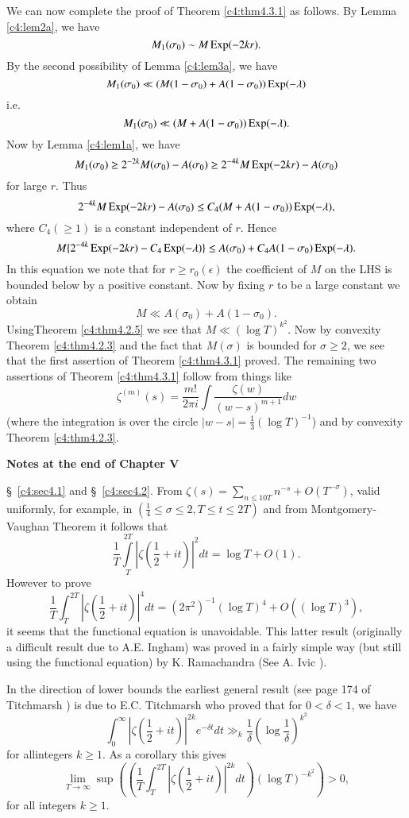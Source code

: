 We can now complete the proof of Theorem \ref{c4:thm4.3.1} as follows. By Lemma \ref{c4:lem2a}, we have
$$
M_1 (\sigma_0) \sim M \operatorname{Exp} (-2 kr).
$$
By the second possibility of Lemma \ref{c4:lem3a}, we have
$$
M_1 (\sigma_0) \ll (M(1-\sigma_0) + A (1-\sigma_0)) \operatorname{Exp} (-\lambda)
$$
i.e.
$$
M_1 (\sigma_0) \ll (M+A(1-\sigma_0)) \operatorname{Exp} (-\lambda).
$$
Now by Lemma \ref{c4:lem1a}, we have 
$$M_1(\sigma_0) \geq 2^{-2k} M(\sigma_0) - A(\sigma_0) \geq 2^{-4k} M
\operatorname{Exp} (-2kr) - A(\sigma_0)$$ 
for large $r$. Thus
$$
2^{-4k} M \operatorname{Exp} (-2kr) - A(\sigma_0) \leq C_4 (M + A(1-\sigma_0)) \operatorname{Exp} (-\lambda),
$$
where $C_4 (\geq 1)$ is a constant independent of $r$. Hence
$$
M \{2^{-4k} \operatorname{Exp} (-2kr) - C_4 \operatorname{Exp} (-\lambda) \} \leq A (\sigma_0) + C_4 A(1-\sigma_0) \operatorname{Exp} (-\lambda).
$$
In this equation we note that for $r \geq r_0 (\epsilon)$ the coefficient of $M$ on the LHS is bounded below by a positive constant. Now by fixing $r$ to be a large constant we obtain
$$
M\ll A (\sigma_0)  + A(1-\sigma_0).
$$
Using\pageoriginale  Theorem \ref{c4:thm4.2.5} we see that $M \ll (\log T)^{k^2}$. Now by convexity Theorem \ref{c4:thm4.2.3} and the fact that $M(\sigma)$ is bounded  for $\sigma \geq 2$, we see that the first assertion of Theorem \ref{c4:thm4.3.1} proved. The remaining  two assertions of Theorem \ref{c4:thm4.3.1} follow from things like
$$
\zeta^{(m)} (s) = \frac{m!}{2\pi i} \int \frac{\zeta(w)}{(w-s)^{m+1}} dw
$$
(where the integration is over the circle $|w -s| = \frac{1}{3} (\log T)^{-1}$) and by convexity Theorem \ref{c4:thm4.2.3}.

\begin{center}
\textbf{Notes at the end of Chapter V}
\end{center}

\S\ \ref{c4:sec4.1} and \S\ \ref{c4:sec4.2}. From $\zeta(s) = \sum\limits_{n \leq 10 T} n^{-s} + O(T^{-\sigma})$, valid uniformly, for example, in $(\frac{1}{4} \leq \sigma \leq 2, T \leq t \leq 2T)$ and from Montgomery-Vaughan Theorem it follows that 
$$
\frac{1}{T} \int\limits^{2T}_T |\zeta \left(\frac{1}{2} + it \right)|^2 dt = \log T + O(1).
$$
However to prove
$$
\frac{1}{T} \int^{2T}_T |\zeta \left(\frac{1}{2} + it \right)|^4 dt = (2\pi^2)^{-1} (\log T)^{4} + O((\log T)^3),
$$
it seems that the functional equation is unavoidable. This latter result (originally a difficult result due to A.E. Ingham) was proved in a fairly simple way (but still using the functional equation) by K. Ramachandra (See A. Ivic \cite{Ivic1}).

In the direction of lower bounds the earliest general result (see page 174 of Titchmarsh \cite{Titchmarsh1}) is due to E.C. Titchmarsh who proved that for $0<\delta <1$, we have
$$
\int^\infty_0 |\zeta \left(\frac{1}{2} + it \right)|^{2k} e^{-\delta t} dt \gg_k \frac{1}{\delta} \left(\log \frac{1}{\delta} \right)^{k^2}
$$
for all\pageoriginale integers $k \geq 1$. As a corollary this gives
$$ 
\lim\limits_{T \to \infty} \sup \left( \left(\frac{1}{T} \int^{2T}_T |\zeta \left(\frac{1}{2} + it \right)|^{2k} dt\right) (\log T)^{-k^2}\right) > 0,
$$
for all integers $k\geq 1$.

